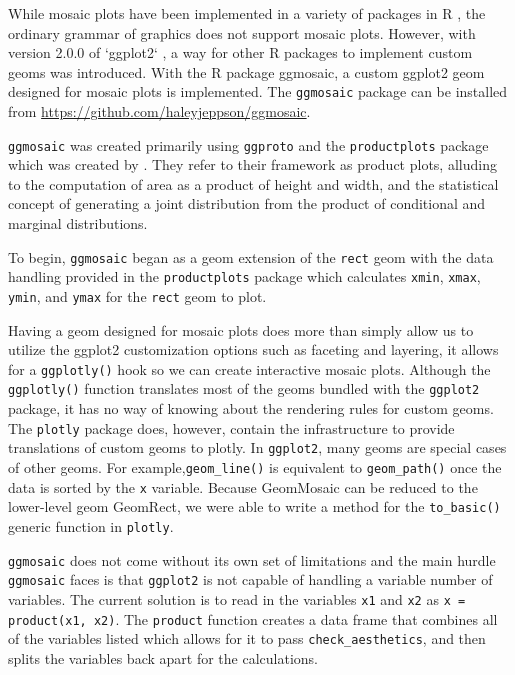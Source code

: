 \documentclass[DIV=calc, paper=a4, fontsize=10pt, twocolumn]{scrartcl}	 %
\begin{document}
\par While mosaic plots have been implemented in a variety of packages in R \citep{R2016}, the ordinary grammar of graphics does not support mosaic plots. However, with version 2.0.0 of `ggplot2` \citep{ggplot2}, a way for other R packages to implement custom geoms was introduced. With the R package ggmosaic, a custom ggplot2 geom designed for mosaic plots is implemented. The \texttt{ggmosaic} package can be installed from \url{https://github.com/haleyjeppson/ggmosaic}.


\par \texttt{ggmosaic} was created primarily using \texttt{ggproto} and the \texttt{productplots} package which was created by \citet{productplots}. They refer to their framework as product plots, alluding to the computation of area as a product of height and width, and the statistical concept of generating a joint distribution from the product of conditional and marginal distributions.

\par To begin, \texttt{ggmosaic} began as a geom extension of the \texttt{rect} geom with the data handling provided in the \texttt{productplots} package which calculates \texttt{xmin}, \texttt{xmax}, \texttt{ymin}, and \texttt{ymax} for the \texttt{rect} geom to plot.

\par Having a geom designed for mosaic plots does more than simply allow us to utilize the ggplot2 customization options such as faceting and layering, it allows for a \texttt{ggplotly()} hook so we can create interactive mosaic plots. Although the \texttt{ggplotly()} function translates most of the geoms bundled with the \texttt{ggplot2} package, it has no way of knowing about the rendering rules for custom geoms. The \texttt{plotly} package does, however, contain the infrastructure to provide translations of custom geoms to plotly. In \texttt{ggplot2}, many geoms are special cases of other geoms. For example,\texttt{geom\_line()} is equivalent to \texttt{geom\_path()} once the data is sorted by the \texttt{x} variable. \citet{carson} Because GeomMosaic can be reduced to the lower-level geom GeomRect, we were able to write a method for the \texttt{to\_basic()} generic function in \texttt{plotly}.


\par \texttt{ggmosaic} does not come without its own set of limitations and the main hurdle \texttt{ggmosaic} faces is that \texttt{ggplot2} is not capable of handling a variable number of variables. The current solution is to read in the variables \texttt{x1} and \texttt{x2} as \texttt{x = product(x1, x2)}. The \texttt{product} function creates a data frame that combines all of the variables listed which allows for it to pass \texttt{check\_aesthetics}, and then splits the variables back apart for the calculations.
\end{document}
